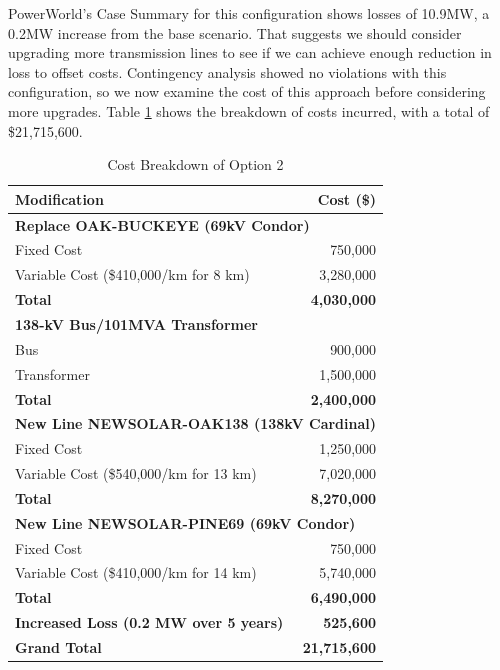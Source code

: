 \documentclass[conference]{IEEEtran}
\begin{document}
PowerWorld's Case Summary for this configuration shows losses of 10.9MW, a 0.2MW increase from the base scenario. That suggests we should consider upgrading more transmission lines to see if we can achieve enough reduction in loss to offset costs. Contingency analysis showed no violations with this configuration, so we now examine the cost of this approach before considering more upgrades. Table \ref{tab:cost_breakdown_with_losses} shows the breakdown of costs incurred, with a total of \$21,715,600.
\begin{table}[h!]
	\centering
	\begin{tabular}{|l|r|}
		\hline
		\textbf{Modification} & \textbf{Cost (\$)} \\ \hline
		\multicolumn{2}{|l|}{\textbf{Replace OAK-BUCKEYE (69kV Condor)}} \\ 
		\hspace{1em} Fixed Cost & 750,000 \\ 
		\hspace{1em} Variable Cost (\$410,000/km for 8 km) & 3,280,000 \\ 
		\hspace{1em} \textbf{Total} & \textbf{4,030,000} \\ \hline
		\multicolumn{2}{|l|}{\textbf{138-kV Bus/101MVA Transformer}} \\ 
		\hspace{1em} Bus & 900,000 \\ 
		\hspace{1em} Transformer & 1,500,000 \\ 
		\hspace{1em} \textbf{Total} & \textbf{2,400,000} \\ \hline
		\multicolumn{2}{|l|}{\textbf{New Line NEWSOLAR-OAK138 (138kV Cardinal)}} \\ 
		\hspace{1em} Fixed Cost & 1,250,000 \\ 
		\hspace{1em} Variable Cost (\$540,000/km for 13 km) & 7,020,000 \\ 
		\hspace{1em} \textbf{Total} & \textbf{8,270,000} \\ \hline
		\multicolumn{2}{|l|}{\textbf{New Line NEWSOLAR-PINE69 (69kV Condor)}} \\ 
		\hspace{1em} Fixed Cost & 750,000 \\ 
		\hspace{1em} Variable Cost (\$410,000/km for 14 km) & 5,740,000 \\ 
		\hspace{1em} \textbf{Total} & \textbf{6,490,000} \\ \hline
		\textbf{Increased Loss (0.2 MW over 5 years)} & \textbf{525,600} \\ \hline
		\textbf{Grand Total} & \textbf{21,715,600} \\ \hline
	\end{tabular}
	\vspace{0.5em}
	\caption{Cost Breakdown of Option 2}
	\label{tab:cost_breakdown_with_losses}
\end{table}
\end{document}
